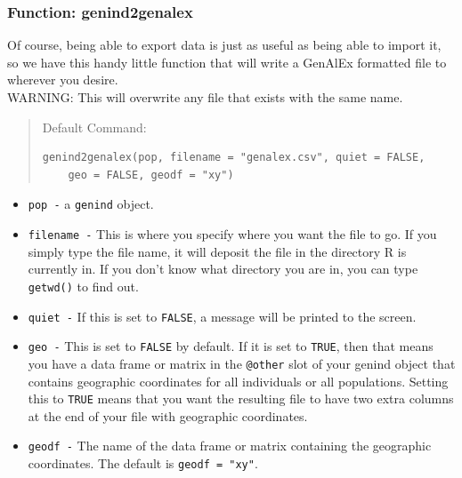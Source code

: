 \documentclass[letterpaper]{article}\usepackage[]{graphicx}\usepackage[]{color}
\makeatletter
\newenvironment{kframe}{%
 \def\at@end@of@kframe{}%
 \ifinner\ifhmode%
  \def\at@end@of@kframe{\end{minipage}}%
  \begin{minipage}{\columnwidth}%
 \fi\fi%
 \def\FrameCommand##1{\hskip\@totalleftmargin \hskip-\fboxsep
 \colorbox{shadecolor}{##1}\hskip-\fboxsep
     \hskip-\linewidth \hskip-\@totalleftmargin \hskip\columnwidth}%
 \MakeFramed {\advance\hsize-\width
   \@totalleftmargin\z@ \linewidth\hsize
   \@setminipage}}%
 {\par\unskip\endMakeFramed%
 \at@end@of@kframe}
\newenvironment{knitrout}{}{} %
\newcommand{\tab}{\hspace*{1em}}
\makeatother
\begin{document}
\subsubsection{Function: genind2genalex}\label{intro:import:genind2genalex}

\tab\tab Of course, being able to export data is just as useful as being able to import it, so we have this handy little function that will write a GenAlEx formatted file to wherever you desire.\\ 
WARNING: This will overwrite any file that exists with the same name.
\begin{quote}
Default Command:
\begin{knitrout}
\color{fgcolor}\begin{kframe}
\begin{verbatim}
genind2genalex(pop, filename = "genalex.csv", quiet = FALSE, 
    geo = FALSE, geodf = "xy")
\end{verbatim}
\end{kframe}
\end{knitrout}

\end{quote}
\begin{itemize}
  \item \texttt{pop -} a \texttt{genind} object.
  \item \texttt{filename -} This is where you specify where you want the file to go. If you simply type the file name, it will deposit the file in the directory R is currently in. If you don't know what directory you are in, you can type \texttt{getwd()} to find out.
  \item \texttt{quiet -} If this is set to \texttt{FALSE}, a message will be printed to the screen.
  \item \texttt{geo -} This is set to \texttt{FALSE} by default. If it is set to \texttt{TRUE}, then that means you have a data frame or matrix in the \texttt{@other} slot of your genind object that contains geographic coordinates for all individuals or all populations. Setting this to \texttt{TRUE} means that you want the resulting file to have two extra columns at the end of your file with geographic coordinates.
  \item \texttt{geodf -} The name of the data frame or matrix containing the geographic coordinates. The default is \texttt{geodf = "xy"}.
\end{itemize}
\end{document}
